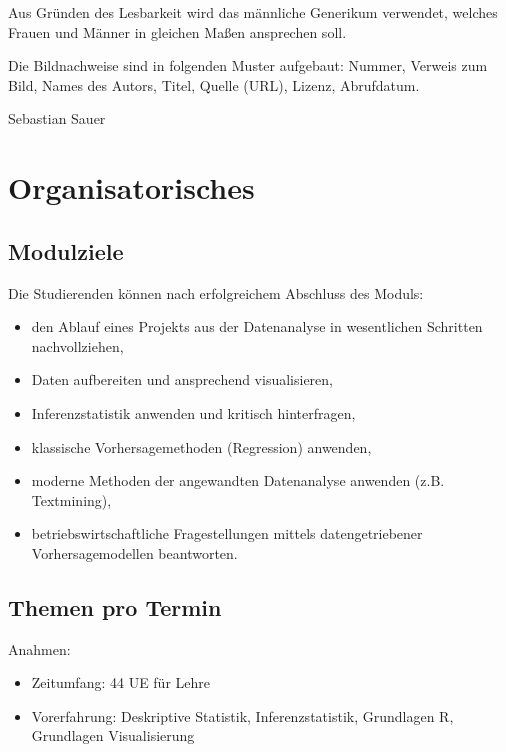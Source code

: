 \documentclass[12pt,ngerman,]{book}
\providecommand{\tightlist}{%
  \setlength{\itemsep}{0pt}\setlength{\parskip}{0pt}}
\begin{document}
Aus Gründen des Lesbarkeit wird das männliche Generikum verwendet,
welches Frauen und Männer in gleichen Maßen ansprechen soll.

Die Bildnachweise sind in folgenden Muster aufgebaut: Nummer, Verweis
zum Bild, Names des Autors, Titel, Quelle (URL), Lizenz, Abrufdatum.

Sebastian Sauer

\chapter{Organisatorisches}\label{organisatorisches}

\section{Modulziele}\label{modulziele}

Die Studierenden können nach erfolgreichem Abschluss des Moduls:

\begin{itemize}
\tightlist
\item
  den Ablauf eines Projekts aus der Datenanalyse in wesentlichen
  Schritten nachvollziehen,
\item
  Daten aufbereiten und ansprechend visualisieren,
\item
  Inferenzstatistik anwenden und kritisch hinterfragen,
\item
  klassische Vorhersagemethoden (Regression) anwenden,
\item
  moderne Methoden der angewandten Datenanalyse anwenden (z.B.
  Textmining),
\item
  betriebswirtschaftliche Fragestellungen mittels datengetriebener
  Vorhersagemodellen beantworten.
\end{itemize}

\section{Themen pro Termin}\label{themen-pro-termin}

Anahmen:

\begin{itemize}
\item
  Zeitumfang: 44 UE für Lehre
\item
  Vorerfahrung: Deskriptive Statistik, Inferenzstatistik, Grundlagen R,
  Grundlagen Visualisierung
\end{itemize}
\end{document}

